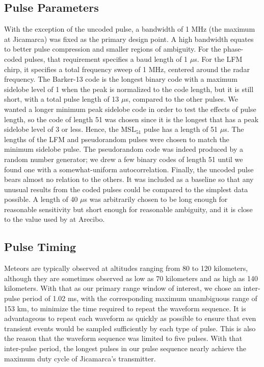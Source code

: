 \subsection{Pulse Parameters}
With the exception of the uncoded pulse, a bandwidth of 1 MHz (the maximum at Jicamarca) was fixed as the primary design point. A high bandwidth equates to better pulse compression and smaller regions of ambiguity. For the phase-coded pulses, that requirement specifies a baud length of 1 $\mu$s. For the LFM chirp, it specifies a total frequency sweep of 1 MHz, centered around the radar frequency. The Barker-13 code is the longest binary code with a maximum sidelobe level of 1 when the peak is normalized to the code length, but it is still short, with a total pulse length of 13 $\mu$s, compared to the other pulses. We wanted a longer minimum peak sidelobe code in order to test the effects of pulse length, so the code of length 51 was chosen since it is the longest that has a peak sidelobe level of 3 or less. Hence, the MSL$_\text{51}$ pulse has a length of 51 $\mu$s. The lengths of the LFM and pseudorandom pulses were chosen to match the minimum sidelobe pulse. The pseudorandom code was indeed produced by a random number generator; we drew a few binary codes of length 51 until we found one with a somewhat-uniform autocorrelation. Finally, the uncoded pulse bears almost no relation to the others. It was included as a baseline so that any unusual results from the coded pulses could be compared to the simplest data possible. A length of 40 $\mu$s was arbitrarily chosen to be long enough for reasonable sensitivity but short enough for reasonable ambiguity, and it is close to the value used by \textcite{MDW+03} at Arecibo.

\subsection{Pulse Timing}
Meteors are typically observed at altitudes ranging from 80 to 120 kilometers, although they are sometimes observed as low as 70 kilometers and as high as 140 kilometers. With that as our primary range window of interest, we chose an inter-pulse period of 1.02 ms, with the corresponding maximum unambiguous range of 153 km, to minimize the time required to repeat the waveform sequence. It is advantageous to repeat each waveform as quickly as possible to ensure that even transient events would be sampled sufficiently by each type of pulse. This is also the reason that the waveform sequence was limited to five pulses. With that inter-pulse period, the longest pulses in our pulse sequence nearly achieve the maximum duty cycle of Jicamarca's transmitter.

